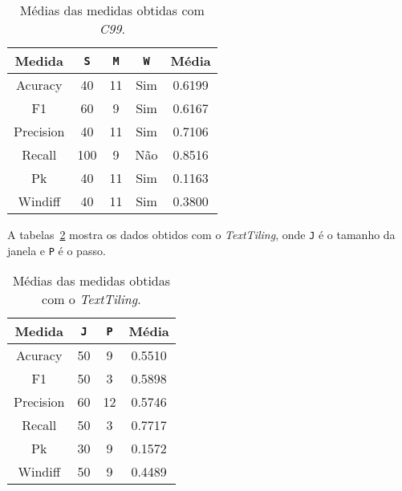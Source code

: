 \begin{table}[!h]
	\centering

	\begin{tabular}{|c|c|c|c|c|}
	
		\hline
		Medida & \texttt{S} & \texttt{M} & \texttt{W} & \textbf{Média}\\		
		\hline

		Acuracy		& 40	& 11 & Sim & 0.6199	\\ \hline	
		F1			& 60	& 9	 & Sim & 0.6167	\\ \hline	
		Precision	& 40	& 11 & Sim & 0.7106	\\ \hline			
		Recall		& 100	& 9	 & Não & 0.8516	\\ \hline		
		Pk			& 40	& 11 & Sim & 0.1163	\\ \hline	
		Windiff		& 40	& 11 & Sim & 0.3800	\\ \hline		

		
	\end{tabular}
	
	\caption{Médias das medidas obtidas com \textit{C99}.}
	\label{tab:mediasC99}
\end{table}


A tabelas~\ref{tab:mediasTextTiling} mostra os dados obtidos com o \textit{TextTiling}, onde \texttt{J} é o tamanho da janela e \texttt{P} é o passo.

\begin{table}[!h]
	\centering

	\begin{tabular}{|c|c|c|c|}
	
		\hline
		Medida & \texttt{J} & \texttt{P} & \textbf{Média}\\		
		\hline

		Acuracy		& 50 & 9 	& 0.5510 \\ \hline	
		F1			& 50 & 3 	& 0.5898 \\ \hline	
		Precision	& 60 & 12 	& 0.5746 \\ \hline			
		Recall		& 50 & 3 	& 0.7717 \\ \hline		
		Pk			& 30 & 9 	& 0.1572 \\ \hline	
		Windiff		& 50 & 9 	& 0.4489 \\ \hline		

		
	\end{tabular}
	
	\caption{Médias das medidas obtidas com o \textit{TextTiling}.}
	\label{tab:mediasTextTiling}
\end{table}


